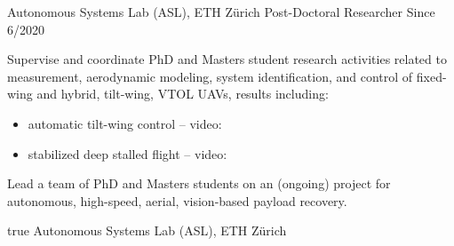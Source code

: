 \label{sec:exp}

\vspace{-8pt}
\begin{cventries}
%
\cvexpentry
  	{Autonomous Systems Lab (ASL), ETH Z\"{u}rich} %
  	{Post-Doctoral Researcher} %
    {} %
    {Since 6/2020} %
    {
      \begin{cvitems} %
      	\item Supervise and coordinate PhD and Masters student research activities related to measurement, aerodynamic modeling, system identification, and control of fixed-wing and hybrid, tilt-wing, VTOL UAVs, results including:
      	\begin{itemize}\setlength{\parskip}{0pt}
      		\item automatic tilt-wing control -- video: 
      		\item stabilized deep stalled flight -- video: 
    		\end{itemize}
      	\item Lead a team of PhD and Masters students on an (ongoing) project for autonomous, high-speed, aerial, vision-based payload recovery.
      \end{cvitems}
    } %
    {} %
    {true}
    {}
%
\cvexpentry
  	{Autonomous Systems Lab (ASL), ETH Z\"{u}rich} %

\end{cventries}
